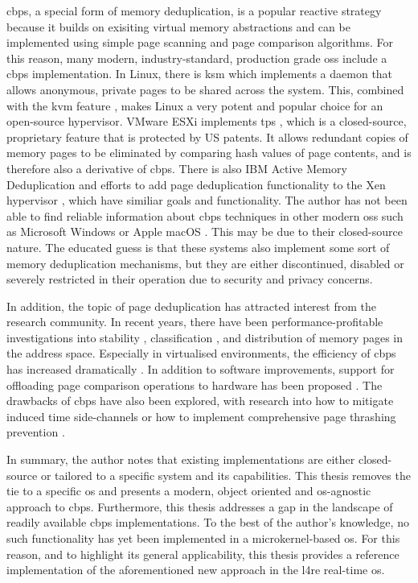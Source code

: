 \Ac{cbps}, a special form of memory deduplication, is a popular reactive strategy because it builds on exisiting virtual memory abstractions and can be implemented using simple page scanning and page comparison algorithms.
For this reason, many modern, industry-standard, production grade \acp{os} include a \ac{cbps} implementation.
In Linux, there is \ac{ksm} \cite{ksm} which implements a daemon that allows anonymous, private pages to be shared across the system.
This, combined with the \ac{kvm} feature \cite{kvm}, makes Linux a very potent and popular choice for an open-source hypervisor.
VMware ESXi implements \ac{tps} \cite{vmware-tps2021}, which is a closed-source, proprietary feature that is protected by US patents.
It allows redundant copies of memory pages to be eliminated by comparing hash values of page contents, and is therefore also a derivative of \ac{cbps}.
There is also IBM Active Memory Deduplication \cite{ibm-amd2012} and efforts to add page deduplication functionality to the Xen hypervisor \cite{vmdedup2014}, which have similiar goals and functionality.
The author has not been able to find reliable information about \ac{cbps} techniques in other modern \acp{os} such as Microsoft Windows \cite{microsoft-windows} or Apple macOS \cite{apple-macos}.
This may be due to their closed-source nature.
The educated guess is that these systems also implement some sort of memory deduplication mechanisms, but they are either discontinued, disabled or severely restricted in their operation due to security and privacy concerns.

In addition, the topic of page deduplication has attracted interest from the research community.
In recent years, there have been performance-profitable investigations into stability \cite{spm-page-stability2016, spm-page-stability2017}, classification \cite{spm-classification2014}, and distribution \cite{spm-distribution2019} of memory pages in the address space.
Especially in virtualised environments, the efficiency of \ac{cbps} has increased dramatically \cite{spm-virtualisation2012}.
In addition to software improvements, support for offloading page comparison operations to hardware has been proposed \cite{spm-hardware2019}.
The drawbacks of \ac{cbps} have also been explored, with research into how to mitigate induced time side-channels \cite{spm-side-channels2018} or how to implement comprehensive page thrashing prevention \cite{spm-thrashing2016}.

In summary, the author notes that existing implementations are either closed-source or tailored to a specific system and its capabilities.
This thesis removes the tie to a specific \ac{os} and presents a modern, object oriented and \ac{os}-agnostic approach to \ac{cbps}.
Furthermore, this thesis addresses a gap in the landscape of readily available \ac{cbps} implementations.
To the best of the author's knowledge, no such functionality has yet been implemented in a microkernel-based \ac{os}.
For this reason, and to highlight its general applicability, this thesis provides a reference implementation of the aforementioned new approach in the \ac{l4re} real-time \ac{os}.

